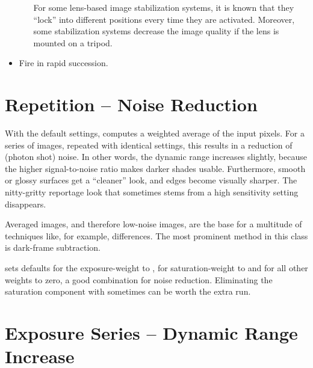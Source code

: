 \begin{itemize}
\begin{itemize}
    For some lens-based image stabilization systems, it is known that
    they ``lock'' into different positions every time they are
    activated.  Moreover, some stabilization systems decrease the
    image quality if the lens is mounted on a tripod.
  \end{itemize}

\item
  Fire in rapid succession.
\end{itemize}




\section[Repetition -- Noise Reduction]%
{Repetition -- Noise Reduction
  \label{sec:repetition}
  }


With the default settings, \App{} computes a weighted average of the
input pixels.  For a series of images, repeated with identical
settings, this results in a reduction of (photon shot) noise.  In
other words, the dynamic range increases slightly, because the higher
signal-to-noise ratio makes darker shades usable.  Furthermore, smooth
or glossy surfaces get a ``cleaner'' look, and edges become visually
sharper.  The nitty-gritty reportage look that sometimes stems from a
high sensitivity setting disappears.

Averaged images, and therefore low-noise images, are the base for a
multitude of techniques like, for example, differences.  The most
prominent method in this class is dark-frame subtraction.

\App{} sets defaults for the exposure-weight to
, for saturation-weight to
 and for all other weights to zero,
a good combination for noise reduction.  Eliminating the saturation
component with  sometimes can be worth
the extra run.


\section[Exposure Series -- Dynamic Range Increase]%
{Exposure Series -- Dynamic Range Increase
  \label{sec:exposure-series--dynamic-range-increase}
  }

